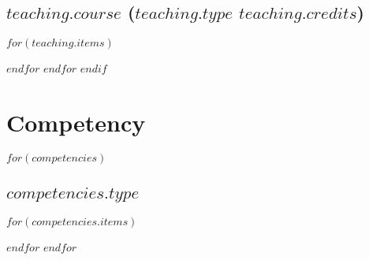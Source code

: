 \documentclass[11pt, a4paper]{article}
\newcommand{\commonspace}{2.1ex}
\begin{document}
  \subsection{$teaching.course$ ($teaching.type$ $teaching.credits$)}
  $for(teaching.items)$
    \begin{separator}
    \end{separator}
    \vspace{-\commonspace}
  $endfor$
$endfor$
$endif$

\section{Competency}
$for(competencies)$
  \subsection{$competencies.type$}
  $for(competencies.items)$
    \begin{separator}
    \end{separator}
    \vspace{-\commonspace}
  $endfor$
$endfor$
\end{document}
